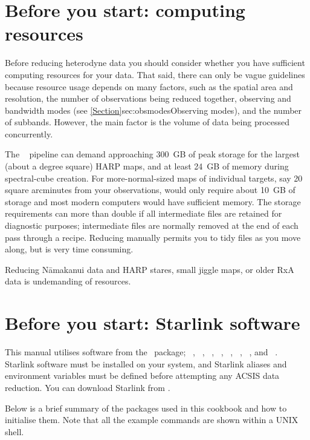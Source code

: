 \documentclass[11pt,oneside,chapters]{starlink}
\begin{document}
\section{ Before you start: computing resources}
\label{sec:computing}

Before reducing heterodyne data you should consider whether you have
sufficient computing resources for your data.  That said, there can
only be vague guidelines because resource usage depends on many
factors, such as the spatial area and resolution, the number of
observations being reduced together, observing and bandwidth modes
(see \cref{Section}{sec:obsmodes}{Observing modes}), and the number of
subbands.  However, the main factor is the volume of data being
processed concurrently.

The \oracdr\ \cite{oracdr,oracdr_infra} pipeline can demand approaching
300~GB of peak storage for the largest (about a degree square) HARP maps,
and at least 24~GB of memory during spectral-cube creation.  For
more-normal-sized maps of individual targets, say 20 square arcminutes
from your observations, would only require about 10~GB of storage and
most modern computers would have sufficient memory.  The storage
requirements can more than double if all intermediate files are
retained for diagnostic purposes; intermediate files are normally
removed at the end of each pass through a recipe.  Reducing manually
permits you to tidy files as you move along, but is very time consuming.

Reducing N\=amakanui data and HARP stares, small jiggle maps, or older
RxA data is undemanding of resources.

\section{Before you start: Starlink software}

This manual utilises software from the \starlink\ package; \smurf\
\cite{smurf}, \Kappa\ \cite{kappa}, \gaia\ \cite{gaia}, \oracdr\
\cite{oracdr}, \convert\ \cite{convert}, \cupid\ \cite{cupid},
\ccdpack\ \cite{ccdpack}, and
\picard\ \cite{picard}. Starlink software must be installed on your
system, and Starlink aliases and environment variables must be defined
before attempting any ACSIS data reduction. You can download Starlink
from  .

Below is a brief summary of the packages used in this cookbook and how
to initialise them. Note that all the example commands are shown within
a UNIX shell.
\end{document}
